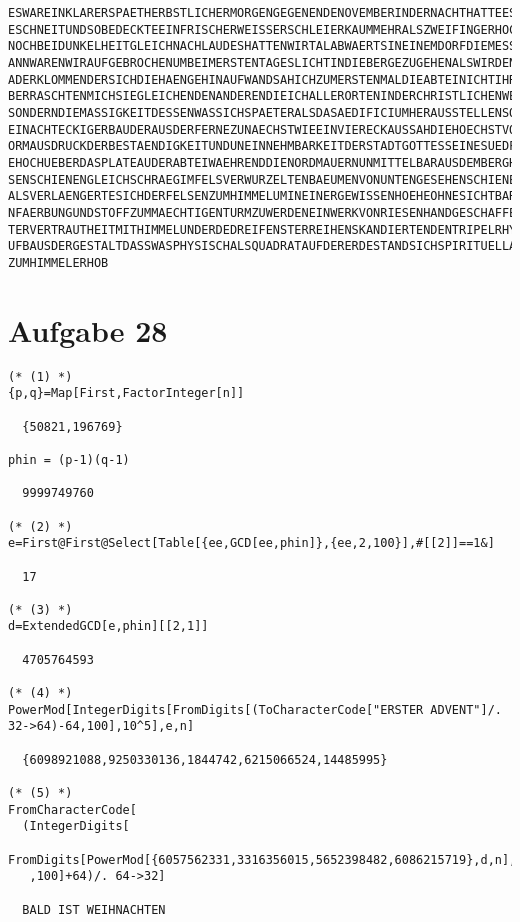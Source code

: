 \begin{verbatim}
ESWAREINKLARERSPAETHERBSTLICHERMORGENGEGENENDENOVEMBERINDERNACHTHATTEESEINWENIGG
ESCHNEITUNDSOBEDECKTEEINFRISCHERWEISSERSCHLEIERKAUMMEHRALSZWEIFINGERHOCHDENBODEN
NOCHBEIDUNKELHEITGLEICHNACHLAUDESHATTENWIRTALABWAERTSINEINEMDORFDIEMESSEGEHOERTD
ANNWARENWIRAUFGEBROCHENUMBEIMERSTENTAGESLICHTINDIEBERGEZUGEHENALSWIRDENSTEILENPF
ADERKLOMMENDERSICHDIEHAENGEHINAUFWANDSAHICHZUMERSTENMALDIEABTEINICHTIHREMAUERNUE
BERRASCHTENMICHSIEGLEICHENDENANDERENDIEICHALLERORTENINDERCHRISTLICHENWELTGESEHEN
SONDERNDIEMASSIGKEITDESSENWASSICHSPAETERALSDASAEDIFICIUMHERAUSSTELLENSOLLTEESWAR
EINACHTECKIGERBAUDERAUSDERFERNEZUNAECHSTWIEEINVIERECKAUSSAHDIEHOECHSTVOLLENDETEF
ORMAUSDRUCKDERBESTAENDIGKEITUNDUNEINNEHMBARKEITDERSTADTGOTTESSEINESUEDFLANKERAGT
EHOCHUEBERDASPLATEAUDERABTEIWAEHRENDDIENORDMAUERNUNMITTELBARAUSDEMBERGHANGZUWACH
SENSCHIENENGLEICHSCHRAEGIMFELSVERWURZELTENBAEUMENVONUNTENGESEHENSCHIENESGERADEZU
ALSVERLAENGERTESICHDERFELSENZUMHIMMELUMINEINERGEWISSENHOEHEOHNESICHTBARENWANDELI
NFAERBUNGUNDSTOFFZUMMAECHTIGENTURMZUWERDENEINWERKVONRIESENHANDGESCHAFFENINGROESS
TERVERTRAUTHEITMITHIMMELUNDERDEDREIFENSTERREIHENSKANDIERTENDENTRIPELRHYTHMUSDESA
UFBAUSDERGESTALTDASSWASPHYSISCHALSQUADRATAUFDERERDESTANDSICHSPIRITUELLALSDREIECK
ZUMHIMMELERHOB
\end{verbatim}

\section*{Aufgabe 28}
\lstset{language=Mathematica}
\begin{lstlisting}
(* (1) *)
{p,q}=Map[First,FactorInteger[n]]

  {50821,196769}

phin = (p-1)(q-1)

  9999749760

(* (2) *)
e=First@First@Select[Table[{ee,GCD[ee,phin]},{ee,2,100}],#[[2]]==1&]

  17

(* (3) *)
d=ExtendedGCD[e,phin][[2,1]]

  4705764593

(* (4) *)
PowerMod[IntegerDigits[FromDigits[(ToCharacterCode["ERSTER ADVENT"]/. 32->64)-64,100],10^5],e,n]

  {6098921088,9250330136,1844742,6215066524,14485995}

(* (5) *)
FromCharacterCode[
  (IntegerDigits[
    FromDigits[PowerMod[{6057562331,3316356015,5652398482,6086215719},d,n],10^10]
   ,100]+64)/. 64->32]

  BALD IST WEIHNACHTEN
\end{lstlisting}

